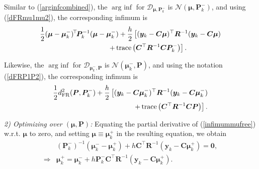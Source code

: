\documentclass[letterpaper,10pt,twocolumn,conference]{ieeeconf}
\newcommand{\cD}{{\mathscr{D}}}
\newcommand{\bby}{{\bm{y}}}
\newcommand{\bmu}{\bm{\mu}}
\newcommand{\bbmu}{\bm{\mu}}
\newcommand{\bbP}{{\bm{P}}}
\newcommand{\bbR}{\bm{R}}
\newcommand{\bbC}{\bm{C}}
\newcommand{\tr}{\operatorname{trace}}
\newcommand{\arginf}{\operatorname{arg\:inf}}
\newcommand{\dFR}{d_{\mathrm{FR}}}
\begin{document}
Similar to (\ref{arginfcombined}), the $\arginf$ for $\cD_{\bmu,\bbP_{k}^{-}}$ is $\mathcal{N}(\bmu,\bbP_{k}^{-})$, and using (\ref{dFRmu1mu2}), the corresponding infimum is
{\small{\begin{align}
&\frac{1}{2}(\bmu-\bmu_{k}^{-})^{\!\top}\!\bbP_{k}^{-1}(\bmu-\bmu_{k}^{-}) + \frac{h}{2}\left[(\bby_{k} - \bbC\bbmu)^{\top}\bbR^{-1}(\bby_{k} - \bbC\bbmu)\right.\nonumber\\
& \left.\hspace*{3.4cm}+\tr\left(\bbC^{\top}\bbR^{-1}\bbC\bbP_{k}^{-}\right)\right].
\label{infimummufree}	
\end{align}}}

Likewise, the $\arginf$ for $\cD_{\bmu_{k}^{-},\bbP}$ is $\mathcal{N}(\bmu_{k}^{-},\bbP)$, and using the notation (\ref{dFRP1P2}), the corresponding infimum is
{\small{\begin{align}
&\frac{1}{2}\dFR^{2}(\bbP,\bbP_{k}^{-}) + \frac{h}{2}\left[(\bby_{k} - \bbC\bbmu_{k}^{-})^{\top}\bbR^{-1}(\bby_{k} - \bbC\bbmu_{k}^{-})\right.\nonumber\\
& \left.\hspace*{4cm}+\tr\left(\bbC^{\top}\bbR^{-1}\bbC\bbP\right)\right].
\label{infimumPfree}	
\end{align}}}



{\em 2) Optimizing over $(\bmu,\bbP)$:}
Equating the partial derivative of (\ref{infimummufree}) w.r.t. $\bbmu$ to zero, and setting $\bmu \equiv \bmu_{k}^{+}$ in the resulting equation, we obtain
\begin{align}
&(\bbP_{k}^{-})^{-1}\left(\bbmu_{k}^{-} - \bbmu_{k}^{+}\right) + h\bbC^{\top}\bbR^{-1}\left(\bby_{k} - \bbC\bbmu_{k}^{+}\right) = \bm{0}, \nonumber\\
\Rightarrow &\bbmu_{k}^{+} = \bbmu_{k}^{-} + h\bbP_{k}^{-}\bbC^{\top}\bbR^{-1}\left(\bby_{k}-\bbC\bbmu_{k}^{+}\right).
\label{IntermediateMeanSDE}	
\end{align}
\end{document}
